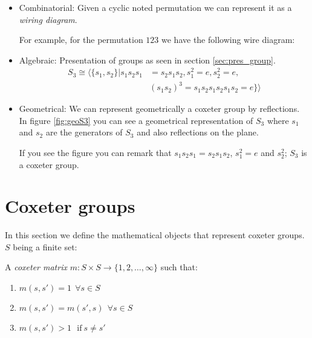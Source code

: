 \begin{itemize}
  \item Combinatorial: Given a cyclic noted permutation we can represent it as a \emph{wiring diagram}.

  For example, for the permutation $123$ we have the following wire diagram:
  \item Algebraic: Presentation of groups as seen in section \ref{sec:pres_group}.
  \begin{equation}\label{equation donnant la form explicite de pi}
  \begin{split}
  S_3 \cong \langle \{s_1, s_2\} | s_1s_2s_1 &= s_2s_1s_2 , s_1^2 = e, s_2^2 = e,\\
   &(s_1s_2)^3 = s_1s_2s_1s_2s_1s_2 = e\} \rangle
  \end{split}
  \end{equation}

  \item Geometrical: We can represent geometrically a coxeter group by reflections. In figure \ref{fig:geoS3} you can see a geometrical representation of $S_3$ where $s_1$ and $s_2$ are the generators of $S_3$ and also reflections on the plane.

  If you see the figure you can remark that $s_1s_2s_1 = s_2s_1s_2$, $s_1^2 = e$ and $s_2^2$; $S_3$ is a coxeter group.
\end{itemize}

\section{Coxeter groups}

In this section we define the mathematical objects that represent coxeter groups. $S$ being a finite set:

\begin{definition}
  A \emph{coxeter matrix} $m : S\times S \to \{1,2,\dots,\infty\}$ such that:
  \begin{enumerate}
    \item $m(s,s') = 1 \ \ \forall s \in S$
    \item $m(s,s') = m(s', s) \ \ \forall s \in S$
    \item $m(s,s') > 1\ \ \ \text{if}\  s \neq s'$
  \end{enumerate}
\end{definition}

